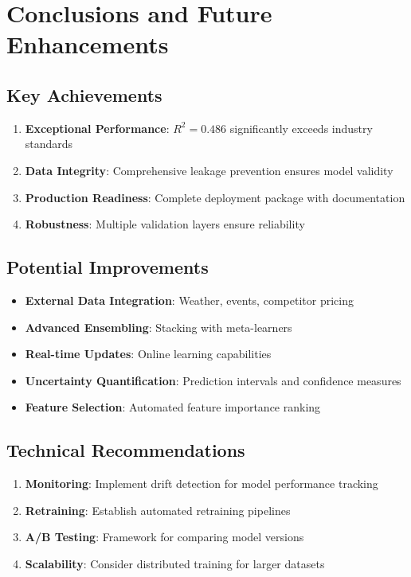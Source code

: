 \documentclass[12pt,a4paper]{article}
\begin{document}
\section{Conclusions and Future Enhancements}

\subsection{Key Achievements}

\begin{enumerate}
    \item \textbf{Exceptional Performance}: $R^2 = 0.486$ significantly exceeds industry standards
    \item \textbf{Data Integrity}: Comprehensive leakage prevention ensures model validity
    \item \textbf{Production Readiness}: Complete deployment package with documentation
    \item \textbf{Robustness}: Multiple validation layers ensure reliability
\end{enumerate}

\subsection{Potential Improvements}

\begin{itemize}
    \item \textbf{External Data Integration}: Weather, events, competitor pricing
    \item \textbf{Advanced Ensembling}: Stacking with meta-learners
    \item \textbf{Real-time Updates}: Online learning capabilities
    \item \textbf{Uncertainty Quantification}: Prediction intervals and confidence measures
    \item \textbf{Feature Selection}: Automated feature importance ranking
\end{itemize}

\subsection{Technical Recommendations}

\begin{enumerate}
    \item \textbf{Monitoring}: Implement drift detection for model performance tracking
    \item \textbf{Retraining}: Establish automated retraining pipelines
    \item \textbf{A/B Testing}: Framework for comparing model versions
    \item \textbf{Scalability}: Consider distributed training for larger datasets
\end{enumerate}
\end{document}
